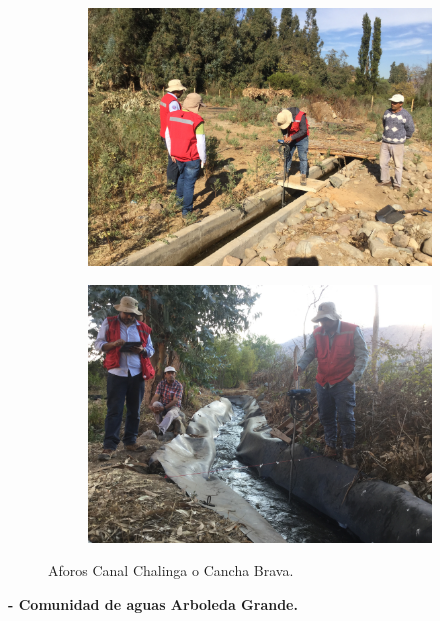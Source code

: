 \documentclass[]{article}
\begin{document}
\begin{figure}[H]
  \centering
\begin{subfigure}{.45\textwidth}
\hfill
  \includegraphics[angle= 180, width=\textwidth]{Foto/ch3.jpg}
\end{subfigure}
\hfill
\begin{subfigure}{.45\textwidth}
\hfill
  \includegraphics[angle= 180, width=\textwidth]{Foto/ch4.jpg} 
\end{subfigure}
\caption{Aforos Canal Chalinga o Cancha Brava.}
\end{figure}
\clearpage

\textbf{- Comunidad de aguas Arboleda Grande.}
\end{document}
